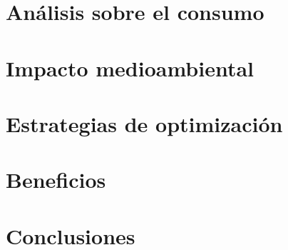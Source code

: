 \documentclass[10pt]{article}
\begin{document}
    
    \section{Análisis sobre el consumo}
    
    	\paragraph{}
           

    \section{Impacto medioambiental}
    	
        \paragraph{}
    
    
    \section{Estrategias de optimización}
    
    	\paragraph{}
    
    \section{Beneficios} 
    
    	\paragraph{}
    
    \section{Conclusiones}
    
\end{document}
